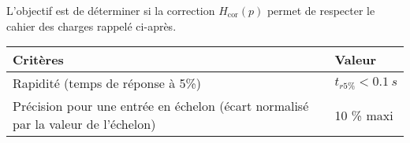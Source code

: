 \begin{obj}
L'objectif est de déterminer si la correction  $H_{\text{cor}}( p)$ permet de respecter le cahier des charges
rappelé ci-après.
\end{obj}

\begin{center}
\begin{tabular}{|p{5.5cm}|l|}
\hline
Critères & Valeur \\ \hline\hline
Rapidité (temps de réponse à 5\%) & $t_{r5\%}<\SI{0,1}{s}$ \\ \hline
Précision pour une entrée en échelon
(écart normalisé par la valeur de l'échelon) & 10 \% maxi \\
\hline
\end{tabular}
\end{center}

%
%
%
%
%
%
%
%
%
%
%

\fi


